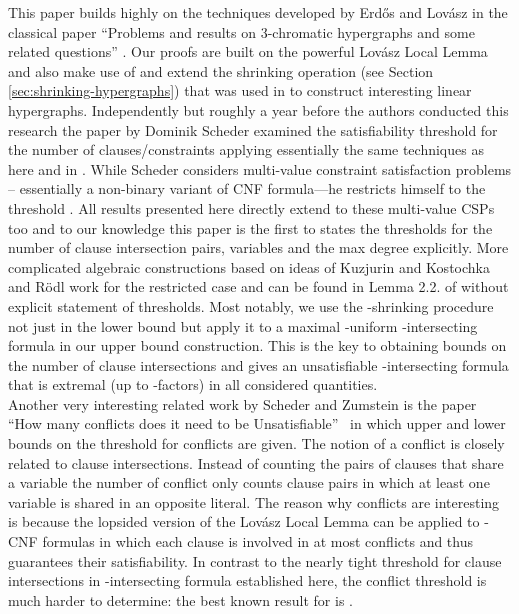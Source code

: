 \documentclass[11pt,letterpaper]{article}
\begin{document}
This paper builds highly on the techniques developed by Erd\H{o}s and Lov\'asz in the classical paper ``Problems and results on 3-chromatic hypergraphs and some related questions'' \cite{ErdoesLovasz}. Our proofs are built on the powerful Lov\'asz Local Lemma and also make use of and extend the shrinking operation (see Section \ref{sec:shrinking-hypergraphs}) that was used in \cite{ErdoesLovasz} to construct interesting linear hypergraphs. Independently but roughly a year before the authors conducted this research the paper \cite{scheder08almostdisjoint} by Dominik Scheder examined the satisfiability threshold for the number of clauses/constraints applying essentially the same techniques as here and in \cite{ErdoesLovasz}. While Scheder considers multi-value constraint satisfaction problems -- essentially a non-binary variant of CNF formula---he restricts himself to the threshold . All results presented here directly extend to these multi-value CSPs too and to our knowledge this paper is the first to states the thresholds for the number of clause intersection pairs, variables and the max degree explicitly. More complicated algebraic constructions based on ideas of Kuzjurin \cite{Kuzjurin} and Kostochka and R\"{o}dl \cite{roedl} work for the restricted case  and can be found in Lemma 2.2. of \cite{Scheder10} without explicit statement of thresholds. Most notably, we use the -shrinking procedure not just in the lower bound but apply it to a maximal -uniform -intersecting formula in our upper bound construction. This is the key to obtaining bounds on the number of clause intersections and gives an unsatisfiable -intersecting formula that is extremal (up to -factors) in all considered quantities. \\


Another very interesting related work by Scheder and Zumstein is the paper ``How many conflicts does it need to be Unsatisfiable''~\cite{scheder08conflicts} in which upper and lower bounds on the threshold for conflicts are given. The notion of a conflict is closely related to clause intersections. Instead of counting the pairs of clauses that share a variable the number of conflict only counts clause pairs in which at least one variable is shared in an opposite literal. The reason why conflicts are interesting is because the lopsided version of the Lov\'asz Local Lemma \cite{erds1991lopsided} can be applied to -CNF formulas in which each clause is involved in at most  conflicts and thus guarantees their satisfiability. In contrast to the nearly tight threshold  for clause intersections in -intersecting formula established here, the conflict threshold is much harder to determine: the best known result for   is  \cite{scheder08conflicts}.
\end{document}
